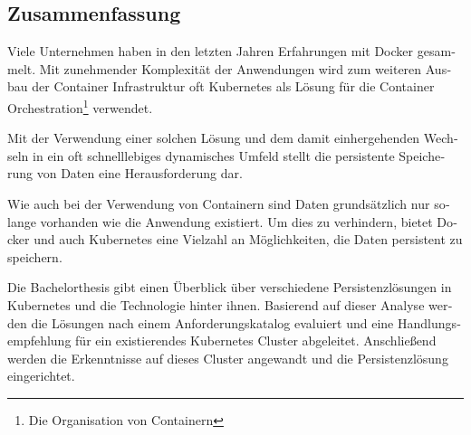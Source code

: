 \begin{otherlanguage}{ngerman}
	\chapter*{Zusammenfassung}
	Viele Unternehmen haben in den letzten Jahren Erfahrungen mit Docker gesammelt. Mit zunehmender Komplexität der Anwendungen wird zum weiteren Ausbau der Container Infrastruktur oft Kubernetes als Lösung für die Container Orchestration\footnote{\label{foot:orchestration}Die Organisation von Containern} verwendet. \medskip
	
	Mit der Verwendung einer solchen Lösung und dem damit einhergehenden Wechseln in ein oft schnelllebiges dynamisches Umfeld stellt die persistente Speicherung von Daten eine Herausforderung dar.  \medskip
    
    Wie auch bei der Verwendung von Containern sind Daten grundsätzlich nur solange vorhanden wie die Anwendung existiert. Um dies zu verhindern, bietet Docker und auch Kubernetes eine Vielzahl an Möglichkeiten, die Daten persistent zu speichern.  \medskip
    
    Die Bachelorthesis gibt einen Überblick über verschiedene Persistenzlösungen in Kubernetes und die Technologie hinter ihnen. Basierend auf dieser Analyse werden die Lösungen nach einem Anforderungskatalog evaluiert und eine Handlungsempfehlung für ein existierendes Kubernetes Cluster abgeleitet. Anschließend werden die Erkenntnisse auf dieses Cluster angewandt und die Persistenzlösung eingerichtet.
\end{otherlanguage}

